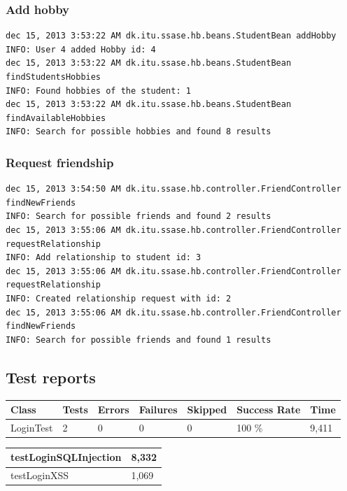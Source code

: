 \documentclass[a4paper]{article}
\begin{document}
\subsubsection{Add hobby}
\begin{verbatim}
dec 15, 2013 3:53:22 AM dk.itu.ssase.hb.beans.StudentBean addHobby
INFO: User 4 added Hobby id: 4 
dec 15, 2013 3:53:22 AM dk.itu.ssase.hb.beans.StudentBean findStudentsHobbies
INFO: Found hobbies of the student: 1
dec 15, 2013 3:53:22 AM dk.itu.ssase.hb.beans.StudentBean findAvailableHobbies
INFO: Search for possible hobbies and found 8 results
\end{verbatim}

\subsubsection{Request friendship}
\begin{verbatim}
dec 15, 2013 3:54:50 AM dk.itu.ssase.hb.controller.FriendController 
findNewFriends
INFO: Search for possible friends and found 2 results
dec 15, 2013 3:55:06 AM dk.itu.ssase.hb.controller.FriendController 
requestRelationship
INFO: Add relationship to student id: 3
dec 15, 2013 3:55:06 AM dk.itu.ssase.hb.controller.FriendController 
requestRelationship
INFO: Created relationship request with id: 2
dec 15, 2013 3:55:06 AM dk.itu.ssase.hb.controller.FriendController 
findNewFriends
INFO: Search for possible friends and found 1 results
\end{verbatim}

\subsection{Test reports}
\begin{table}[h!]
\begin{tabular}{| l | l | l | l | l | l | l |}
\hline
Class & Tests & Errors & Failures & Skipped & Success Rate & Time \\ \hline
LoginTest & 2 & 0 & 0 & 0 & 100 \% & 9,411 \\ \hline
\end{tabular}
\end{table}
\begin{table}[h!]
\begin{tabular}{| l | l |}
\hline
testLoginSQLInjection & 8,332 \\ \hline
testLoginXSS & 1,069 \\ \hline
\end{tabular}
\end{table}
\end{document}
